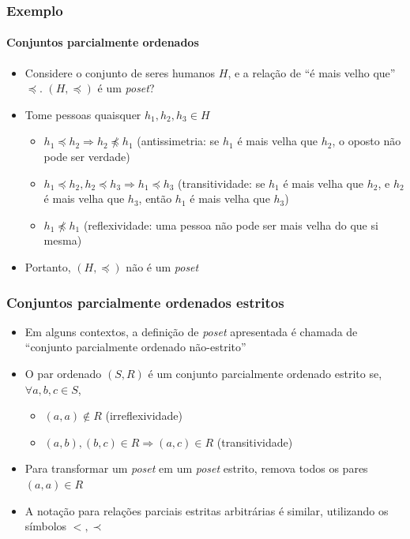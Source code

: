 \documentclass[12pt]{beamer}
\begin{document}
\begin{frame}
  \frametitle{Exemplo}
  \framesubtitle{Conjuntos parcialmente ordenados}
  \begin{itemize}
    \item<1-> Considere o conjunto de seres humanos $H$, e a relação de ``é
        mais velho que'' $\preccurlyeq$. $(H, \preccurlyeq)$ é um \emph{poset}?
    \item<2-> Tome pessoas quaisquer $h_1, h_2, h_3 \in H$
    \begin{itemize}[itemsep=0pt]
      \item<3-> $h_1 \preccurlyeq h_2 \Rightarrow h_2 \not\preccurlyeq h_1$
          (antissimetria: se $h_1$ é mais velha que $h_2$, o oposto não pode
            ser verdade)
      \item<4-> $h_1 \preccurlyeq h_2, h_2 \preccurlyeq h_3 \Rightarrow h_1
          \preccurlyeq h_3$ (transitividade: se $h_1$ é mais velha que $h_2$, e
            $h_2$ é mais velha que $h_3$, então $h_1$ é mais velha que $h_3$)
      \item<5-> $h_1 \not\preccurlyeq h_1$ (reflexividade: uma pessoa não pode
          ser mais velha do que si mesma)
    \end{itemize}
    \item<6-> Portanto, $(H, \preccurlyeq)$ não é um \emph{poset}
  \end{itemize}
\end{frame}

\begin{frame}
  \frametitle{Conjuntos parcialmente ordenados estritos}
  \begin{itemize}
    \item Em alguns contextos, a definição de \emph{poset} apresentada é
        chamada de ``conjunto parcialmente ordenado não-estrito''
    \item<1-> O par ordenado $(S, R)$ é um conjunto parcialmente ordenado
        estrito se, $\forall a, b, c \in S$,
    \begin{itemize}[itemsep=0pt]
      \item<2-> $(a, a) \not\in R$ (irreflexividade)
      \item<3-> $(a, b), (b, c) \in R \Rightarrow (a, c) \in R$ (transitividade)
    \end{itemize}
    \item Para transformar um \emph{poset} em um \emph{poset} estrito,
        remova todos os pares $(a, a) \in R$
    \item A notação para relações parciais estritas arbitrárias é similar,
        utilizando os símbolos $<, \prec$
  \end{itemize}
\end{frame}
\end{document}
